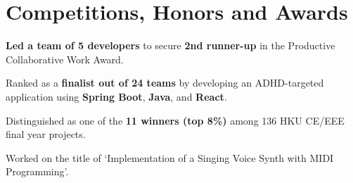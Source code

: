 \documentclass[a4paper,10pt]{article}
\begin{document}
\newcommand{\certificateName}[3]{\textbf{#1} -- #2 [#3]}
\newcommand{\certificateItem}[4]{\certificateName{#1}{#2}{#3} & \href{#4}{\underline{Credential}}\\}
\newenvironment{spacedtabular*}[1]
{\setlength{\extrarowheight}{1pt}\begin{tabular*}{#1}{>{\small}l @{\extracolsep{\fill}} >{\bfseries \small}r}}
    {\end{tabular*}}


\section{Competitions, Honors and Awards}

\begin{tightitemize}
  \item \textbf{Led a team of 5 developers} to secure \textbf{2nd runner-up} in the Productive Collaborative Work Award.
  \item Ranked as a \textbf{finalist out of 24 teams} by developing an ADHD-targeted application using \textbf{Spring Boot}, \textbf{Java}, and \textbf{React}.
\end{tightitemize}

\begin{tightitemize}
  \item Distinguished as one of the \textbf{11 winners (top 8\%)} among 136 HKU CE/EEE final year projects.
  \item Worked on the title of `Implementation of a Singing Voice Synth with MIDI Programming'.
\end{tightitemize}


\end{document}

